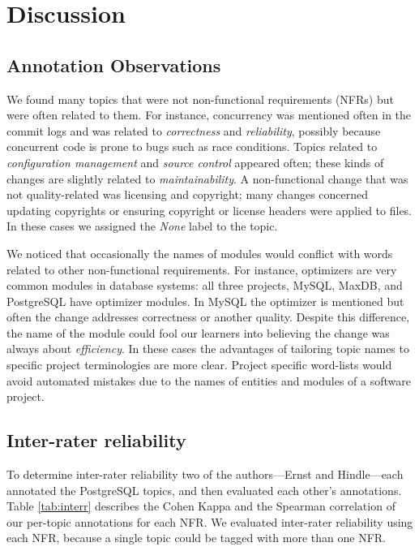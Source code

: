 \documentclass[smallextended]{svjour3}       %
\begin{document}
\section{Discussion}
\label{sec:limit}

\subsection{Annotation Observations}
We found many topics that were not non-functional requirements (NFRs) but were often related to them. 
For instance, concurrency was mentioned often in the commit logs and
was related to \emph{correctness} and \emph{reliability}, possibly because concurrent code is prone to bugs such as race conditions. %
Topics related to \emph{configuration management} and \emph{source control} appeared often; %
these kinds of changes are slightly related to \emph{maintainability}. 
A non-functional change that was not quality-related was licensing and
copyright; many changes concerned updating copyrights or
ensuring copyright or license headers were applied to files. In these
cases we assigned the \emph{None} label to the topic.

We noticed that occasionally the names of modules would conflict with words related to other non-functional requirements. 
For instance, optimizers are very common modules in database systems:
all three projects, MySQL, MaxDB, and PostgreSQL have optimizer modules. 
In MySQL the optimizer is mentioned but often the change addresses  correctness or another quality. 
Despite this difference, the name of the module could fool our learners into believing the change was always about \emph{efficiency}. 
In these cases the advantages of tailoring topic names to specific project terminologies are more clear. 
Project specific word-lists would avoid automated mistakes due to the names of entities and modules of a software project.

\subsection{Inter-rater reliability}
\label{sec:inter-rater}
To determine inter-rater reliability two of the authors---Ernst and Hindle---each annotated the PostgreSQL topics,
and then evaluated each other's annotations. 
Table \ref{tab:interr} describes the Cohen Kappa and the Spearman
correlation of our per-topic annotations for each NFR. We 
evaluated inter-rater reliability using each NFR, because a single topic could be
tagged with more than one NFR.
\end{document}
